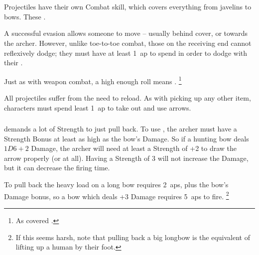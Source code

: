 
\section{}

\begin{multicols}{2}

\noindent
Projectiles have their own Combat \gls{skill}, which covers everything from javelins to bows.
These .

A successful evasion allows someone to move -- usually behind cover, or towards the archer.
However, unlike toe-to-toe combat, those on the receiving end cannot reflexively dodge; they must have at least 1~\gls{ap} to spend in order to dodge with their .

Just as with weapon combat, a high enough roll means .
\footnote{As covered .}

All projectiles suffer from the need to reload.
As with picking up any other item, characters must spend least 1~\gls{ap} to take out and use arrows.

\subsubsection{}
\label{longbow}
demands a lot of Strength to just pull back.
To use , the archer must have a Strength Bonus at least as high as the bow's Damage.
So if a hunting bow deals $1D6+2$ Damage, the archer will need at least a Strength of +2 to draw the arrow properly (or at all).
Having a Strength of 3 will not increase the Damage, but it can decrease the firing time.

To pull back the heavy load on a long bow requires 2~\glspl{ap}, plus the bow's Damage bonus, so a bow which deals +3 Damage requires 5~\glspl{ap} to fire.%
\footnote{If this seems harsh, note that pulling back a big longbow is the equivalent of lifting up a human by their foot.}


\end{multicols}
